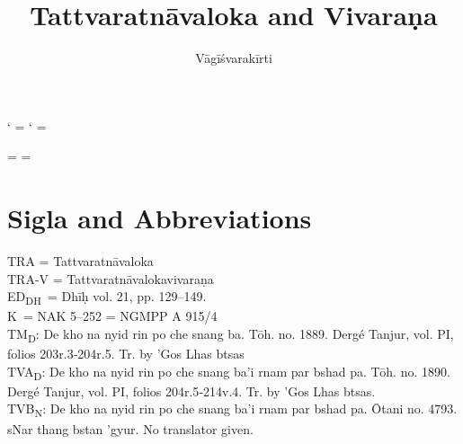 \documentclass[12pt]{article}
\title{Tattvaratnāvaloka and Vivaraṇa}
\author{Vāgīśvarakīrti}
\begin{document}
\maketitle

\makeatletter
\newXeTeXintercharclass\noextraclass
\XeTeXcharclass `\? = \noextraclass
\XeTeXcharclass `\! = \noextraclass

 \noextraclass = {\nobreak}
\XeTeXinterchartoks {} = {\nobreak}
\makeatother

\newcommand{\PCreading}{$^{pc}$}
\newcommand{\ACreading}{$^{ac}$}
\newcommand{\MS}{K}
\newcommand{\EDD}{ED\textsubscript{DH}}
\newcommand{\TM}{TM\textsubscript{D}}
\newcommand{\TVA}{TVA\textsubscript{D}}
\newcommand{\TVB}{TVB\textsubscript{N}}
\newcommand{\sigmareading}[1]{$\Sigma$\textsubscript{#1}}

\newcommand{\emd} {\emph{em.}}
\newcommand{\conj} {\emph{conj.}}
\newcommand{\corr} {\emph{corr.}}
\newcommand{\diag} {\emph{diag.\ conj.}}
\newcommand{\possibleemd} {\emph{possible em.}}
\newcommand{\possibleconj} {\emph{possible conj.}}

\section{Sigla and Abbreviations}
\noindent TRA = Tattvaratnāvaloka\\

\noindent TRA-V = Tattvaratnāvalokavivaraṇa\\

\noindent \EDD\ = Dhīḥ vol. 21, pp. 129–149.\\

\noindent \MS\ = NAK 5–252 = NGMPP A 915/4\\

\noindent \TM : De kho na nyid rin po che snang ba. Tōh. no. 1889. Dergé Tanjur, vol. PI, folios 203r.3‑204r.5. Tr. by 'Gos Lhas btsas\\

\noindent \TVA : De kho na nyid rin po che snang ba'i rnam par bshad pa.  Tōh. no. 1890.  Dergé Tanjur, vol. PI, folios 204r.5‑214v.4. Tr. by 'Gos Lhas btsas.\\

\noindent \TVB : De kho na nyid rin po che snang ba'i rnam par bshad pa.  Ōtani no. 4793.  sNar thang bstan 'gyur. No translator given.
\end{document}
